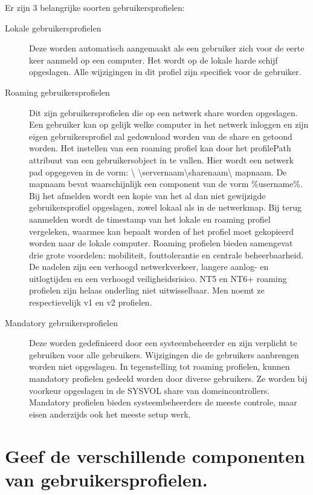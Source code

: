 Er zijn 3 belangrijke soorten gebruikersprofielen:
\begin{description}
	\item[Lokale gebruikersprofielen] Deze worden automatisch aangemaakt als
		een gebruiker zich voor de eerte keer aanmeld op een computer.
		Het wordt op de lokale harde schijf opgeslagen. Alle wijzigingen
		in dit profiel zijn specifiek voor de gebruiker.
	\item[Roaming gebruikersprofielen] Dit zijn gebruikersprofielen die op
		een netwerk share worden opgeslagen. Een gebruiker kan op gelijk
		welke computer in het netwerk inloggen en zijn eigen
		gebruikersprofiel zal gedownload worden van de share en getoond
		worden. Het instellen van een roaming profiel kan door het
		profilePath attribuut van een gebruikersobject in te vullen.
		Hier wordt een netwerk pad opgegeven in de vorm: \textbackslash
		\textbackslash servernaam\textbackslash sharenaam\textbackslash
		mapnaam. De mapnaam bevat waarschijnlijk een component van de
		vorm \%username\%.
		Bij het afmelden wordt een kopie van het al dan niet gewijzigde
		gebruikersprofiel opgeslagen, zowel lokaal als in de netwerkmap.
		Bij terug aanmelden wordt de timestamp van het lokale en roaming
		profiel vergeleken, waarmee kan bepaalt worden of het profiel
		moet gekopieerd worden naar de lokale computer.
		Roaming profielen bieden samengevat drie grote voordelen:
		mobiliteit, fouttolerantie en centrale beheerbaarheid. De
		nadelen zijn een verhoogd netwerkverkeer, langere aanlog- en
		uitlogtijden en een verhoogd veiligheidsrisico. NT5 en NT6+
		roaming profielen zijn helaas onderling niet uitwisselbaar. Men
		noemt ze respectievelijk v1 en v2 profielen.
	\item[Mandatory gebruikersprofielen] Deze worden gedefinieerd door een
		systeembeheerder en zijn verplicht te gebruiken voor alle
		gebruikers. Wijzigingen die de gebruikers aanbrengen worden niet
		opgeslagen. In tegenstelling tot roaming profielen, kunnen
		mandatory profielen gedeeld worden door diverse gebruikers. Ze
		worden bij voorkeur opgeslagen in de SYSVOL share van
		domeincontrollers. Mandatory profielen bieden systeembeheerders
		de meeste controle, maar eisen anderzijds ook het meeste setup
		werk.
\end{description}

\section{Geef de verschillende componenten van gebruikersprofielen.}

